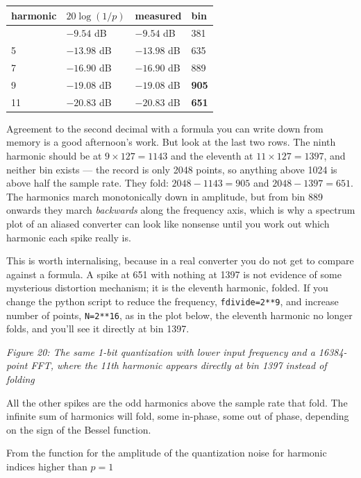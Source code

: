 \begin{longtable}[]{@{}llll@{}}
\toprule\noalign{}
harmonic & \(20\log(1/p)\) & measured & bin \\
\midrule\noalign{}
\endhead
\bottomrule\noalign{}
\endlastfoot
3 & \(-9.54\) dB & \(-9.54\) dB & 381 \\
5 & \(-13.98\) dB & \(-13.98\) dB & 635 \\
7 & \(-16.90\) dB & \(-16.90\) dB & 889 \\
9 & \(-19.08\) dB & \(-19.08\) dB & \textbf{905} \\
11 & \(-20.83\) dB & \(-20.83\) dB & \textbf{651} \\
\end{longtable}

Agreement to the second decimal with a formula you can write down from
memory is a good afternoon's work. But look at the last two rows. The
ninth harmonic should be at \(9 \times 127 = 1143\) and the eleventh at
\(11 \times 127 = 1397\), and neither bin exists --- the record is only
2048 points, so anything above 1024 is above half the sample rate. They
fold: \(2048 - 1143 = 905\) and \(2048 - 1397 = 651\). The harmonics
march monotonically down in amplitude, but from bin 889 onwards they
march \emph{backwards} along the frequency axis, which is why a spectrum
plot of an aliased converter can look like nonsense until you work out
which harmonic each spike really is.

This is worth internalising, because in a real converter you do not get
to compare against a formula. A spike at 651 with nothing at 1397 is not
evidence of some mysterious distortion mechanism; it is the eleventh
harmonic, folded. If you change the python script to reduce the
frequency, \texttt{fdivide=2**9}, and increase number of points,
\texttt{N=2**16}, as in the plot below, the eleventh harmonic no longer
folds, and you'll see it directly at bin 1397.


{
\centering
{}
}

\emph{Figure 20: The same 1-bit quantization with lower input frequency
and a 16384-point FFT, where the 11th harmonic appears directly at bin
1397 instead of folding}

All the other spikes are the odd harmonics above the sample rate that
fold. The infinite sum of harmonics will fold, some in-phase, some out
of phase, depending on the sign of the Bessel function.

From the function for the amplitude of the quantization noise for
harmonic indices higher than \(p=1\)

